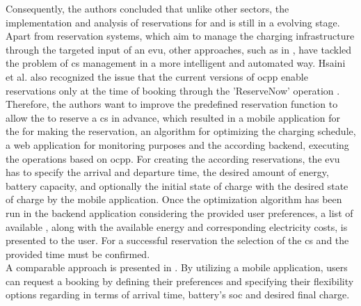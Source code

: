 Consequently, the authors concluded that unlike other sectors, the implementation and analysis of reservations for  and  is still in a evolving stage. \\
\noindent Apart from reservation systems, which aim to manage the charging infrastructure through the targeted input of an \acrshort{evu}, other approaches, such as in \cite{hsaini_ocpp-based_2022}, have tackled the problem of \acrshort{cs} management in a more intelligent and automated way.
Hsaini et al. also recognized the issue that the current versions of \acrshort{ocpp} enable reservations only at the time of booking through the 'ReserveNow' operation \cite{noauthor_ocpp_nodate-1,noauthor_ocpp_nodate}.
Therefore, the authors want to improve the predefined reservation function to allow the  to reserve a \acrshort{cs} in advance, which resulted in a mobile application for the  for making the reservation, an algorithm for optimizing the charging schedule, a web application for monitoring purposes and the according backend, executing the operations based on \acrshort{ocpp}.
For creating the according reservations, the \acrshort{evu} has to specify the arrival and departure time, the desired amount of energy, battery capacity, and optionally the initial state of charge with the desired state of charge by the mobile application.
Once the optimization algorithm has been run in the backend application considering the provided user preferences, a list of available , along with the available energy and corresponding electricity costs, is presented to the user. For a successful reservation the selection of the \acrshort{cs} and the provided time must be confirmed. \\
\noindent A comparable approach is presented in \cite{orcioni_ev_2020}. By utilizing a mobile application, users can request a booking by defining their preferences and specifying their flexibility options regarding in terms of arrival time, battery's \acrshort{soc} and desired final charge.
